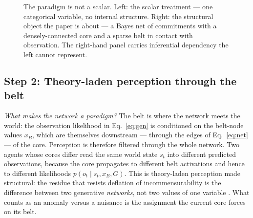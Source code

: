 \begin{figure}[t]
\caption{The paradigm is not a scalar. Left: the scalar treatment ---
one categorical variable, no internal structure. Right: the structural
object the paper is about --- a Bayes net of commitments with a
densely-connected core and a sparse belt in contact with observation.
The right-hand panel carries inferential dependency the left cannot
represent.}
\label{fig:structured}
\end{figure}

\subsection{Step 2: Theory-laden perception through the belt}
\label{ssec:perception}

\noindent\textit{What makes the network a \emph{paradigm}?} The belt is
where the network meets the world: the observation likelihood in
Eq.~\eqref{eq:gen} is conditioned on the belt-node values $x_B$, which
are themselves downstream --- through the edges of
Eq.~\eqref{eq:net} --- of the core. Perception is therefore filtered
through the whole network. Two agents whose cores differ read the same
world state $s_t$ into different predicted observations, because the
core propagates to different belt activations and hence to different
likelihoods $p(o_t \mid s_t, x_B, G)$. This is theory-laden perception
made structural: the residue that resists deflation of incommensurability
is the difference between two generative \emph{networks}, not two values
of one variable \citep{Chang2012_9, Carrier2002_4, Malone1993_5}. What
counts as an anomaly versus a nuisance is the assignment the current
core forces on its belt.

